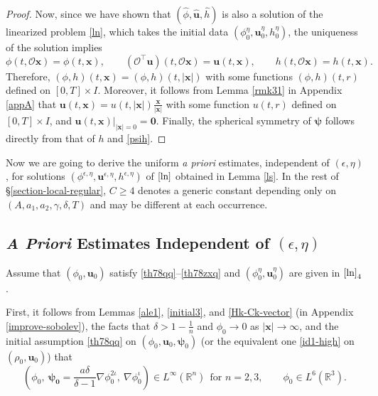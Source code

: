 \documentclass[11pt,reqno]{amsart}
\numberwithin{rk}{section}
\numberwithin{prop}{section}
\numberwithin{mydef}{section}
\numberwithin{lem}{section}
\numberwithin{equation}{section}
\numberwithin{thm}{section}
\begin{document}
\begin{proof}
Now, since we have shown that $(\hat \phi,\hat{\boldsymbol{u}},\hat{h})$  is also a solution of the linearized problem \eqref{ln}, which takes the initial data $(\phi_0^\eta,\boldsymbol{u}_0^\eta,h_0^\eta)$, the uniqueness of the solution implies
\begin{equation*} 
\phi(t,\mathcal{O}\boldsymbol{x})=\phi(t,\boldsymbol{x}), \qquad (\mathcal{O}^{\top}\boldsymbol{u})(t,\mathcal{O}\boldsymbol{x})=\boldsymbol{u}(t,\boldsymbol{x}), \qquad h(t,\mathcal{O}\boldsymbol{x})=h(t,\boldsymbol{x}).
\end{equation*}
Therefore,  $(\phi,h)(t,\boldsymbol{x})=(\phi,h)(t,|\boldsymbol{x}|)$ with some functions $(\phi,h)(t,r)$ defined on $[0,T]\times I$. Moreover, it follows from Lemma \ref{rmk31} in Appendix \ref{appA} that   $\boldsymbol{u}(t,\boldsymbol{x})
=u(t,|\boldsymbol{x}|)\frac{\boldsymbol{x}}{|\boldsymbol{x}|}$ with some function $u(t,r)$ defined on $[0,T]\times I$, and $\boldsymbol{u}(t,\boldsymbol{x})|_{|\boldsymbol{x}|=0}=\boldsymbol{0}$. Finally, the spherical symmetry of $\boldsymbol{\psi}$ follows directly from that of $h$ and \eqref{psih}. 
\end{proof}
 
Now we are going to derive the uniform \textit{a priori} estimates, independent of $(\epsilon,\eta)$, for solutions $(\phi^{\epsilon,\eta},\boldsymbol{u}^{\epsilon,\eta},h^{\epsilon,\eta})$ of $\eqref{ln}$ obtained in Lemma \ref{ls}. In the rest of \S \ref{section-local-regular},  $C\geq 4$  denotes a generic constant depending only on  $(A, a_1,a_2, \gamma, \delta, T)$ and may be different at each occurrence. 

\subsection{\textit{A Priori} Estimates Independent of $(\epsilon,\eta)$}  \label{priorilinear}
Assume that  $(\phi_0,\boldsymbol{u}_0)$  satisfy \eqref{th78qq}--\eqref{th78zxq} and $(\phi^\eta_0,\boldsymbol{u}^\eta_0)$ are given in $\eqref{ln}_4$.


First, it follows from Lemmas \ref{ale1}, \ref{initial3}, and \ref{Hk-Ck-vector} (in Appendix \ref{improve-sobolev}), the facts that $\delta>1-\frac{1}{n}$ and $\phi_0\rightarrow 0$ as $|\boldsymbol{x}|\to \infty$,
and the initial assumption \eqref{th78qq} on $(\phi_0,\boldsymbol{u}_0,\boldsymbol{\psi}_0)$ (or the equivalent one \eqref{id1-high} on $(\rho_0,\boldsymbol{u}_0)$) that 
\begin{equation*}
(\phi_0,\ \boldsymbol{\psi_0}=\frac{a\delta}{\delta-1}\nabla \phi^{2\iota}_0,\ \nabla \phi^{\iota}_0)\in L^\infty(\mathbb{R}^n) \ \ \text{for $n=2,3$}, \qquad  \phi_0\in L^6(\mathbb{R}^3).
\end{equation*}
\end{document}
